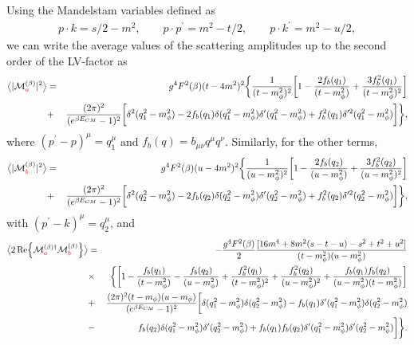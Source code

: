 \documentclass[11pt,showpacs,preprintnumbers,amsmath,amssymb,prd,nofootinbib,superscriptaddress]{revtex4-2}
\begin{document}
Using the Mandelstam variables defined as
\begin{eqnarray}
    p\cdot k=s/2-m^2,\quad\quad p\cdot p^\prime=m^2-t/2,\quad\quad p\cdot k^\prime=m^2-u/2,
\end{eqnarray}
we can write the average values of the scattering amplitudes up to the second order of the LV-factor as
\small{\begin{eqnarray}
\bigl\langle|\mathcal{M}^{(\beta)}_{\textcolor{red}{a}}|^2\bigr\rangle&=&g^4F^2(\beta)(t-4m^2)^2\biggl\{\frac{1}{(t-m_\phi^2)^2}\bigg[1-\frac{2f_b(q_1)}{(t-m_\phi^2)}+\frac{3f_b^2(q_1)}{(t-m_\phi^2)^2}\bigg]\nonumber\\
&+&\frac{(2\pi)^2}{(e^{\beta E_{CM}}-1)^2}\biggl[\delta^2(q_1^2-m_\phi^2)-2f_b(q_1)\delta(q_1^2-m_\phi^2)\delta^\prime(q_1^2-m_\phi^2)+f_b^2(q_1)\delta^{\prime2}(q_1^2-m_\phi^2)\biggr]\biggr\},
    \end{eqnarray}}
where $(p^\prime-p)^\mu=q_1^\mu$ and $f_b(q)=b_{\mu\nu}q^{\mu}q^{\nu}$. Similarly, for the other terms,
\begin{eqnarray}
    \bigl\langle|\mathcal{M}^{(\beta)}_{\textcolor{red}{b}}|^2\bigr\rangle&=&g^4F^2(\beta)(u-4m^2)^2\biggl\{\frac{1}{(u-m_\phi^2)^2}\bigg[1-\frac{2f_b(q_2)}{(u-m_\phi^2)}+\frac{3f_b^2(q_2)}{(u-m_\phi^2)^2}\bigg]\\&+&\frac{(2\pi)^2}{(e^{\beta E_{CM}}-1)^2}\biggl[\delta^2(q_2^2-m_\phi^2)-2f_b(q_2)\delta(q_2^2-m_\phi^2)\delta^\prime(q_2^2-m_\phi^2)+f_b^2(q_2)\delta^{\prime2}(q_2^2-m_\phi^2)\biggr]\biggr\},\nonumber
    \end{eqnarray}
with $(p^\prime-k)^\mu=q_2^\mu$, and
\begin{eqnarray}
    \bigl\langle2\Re{\mathcal{M}_{\textcolor{red}{a}}^{(\beta)\dagger}\mathcal{M}_{\textcolor{red}{b}}^{(\beta)}}\bigr\rangle&=&-\frac{g^4F^2(\beta)}{2}\frac{[16m^4+8m^2(s-t-u)-s^2+t^2+u^2]}{(t-m^2_{\phi})(u-m^2_{\phi})}\nonumber\\&\times&\biggl\{\bigg[1-\frac{f_b(q_1)}{(t-m_\phi^2)}-\frac{f_b(q_2)}{(u-m_\phi^2)}+\frac{f_b^2(q_1)}{(t-m_\phi^2)^2}+\frac{f^2_b(q_2)}{(u-m_\phi^2)^2}+\frac{f_b(q_1)f_b(q_2)}{(u-m_\phi^2)(t-m_\phi^2)}\bigg]\nonumber\\
    &+&\frac{(2\pi)^2(t-m_{\phi})(u-m_{\phi})}{(e^{\beta E_{CM}}-1)^2}\biggl[\delta(q_1^2-m_{\phi}^2)\delta(q_2^2-m_{\phi}^2)-f_b(q_1)\delta^\prime(q_1^2-m_{\phi}^2)\delta(q_2^2-m_{\phi}^2)\nonumber\\&-&f_b(q_2)\delta(q_1^2-m_{\phi}^2)\delta^\prime(q_2^2-m_{\phi}^2)+f_b(q_1)f_b(q_2)\delta^\prime(q_1^2-m_{\phi}^2)\delta^\prime(q_2^2-m_{\phi}^2)\biggr]\biggr\}.
\end{eqnarray}
\end{document}
